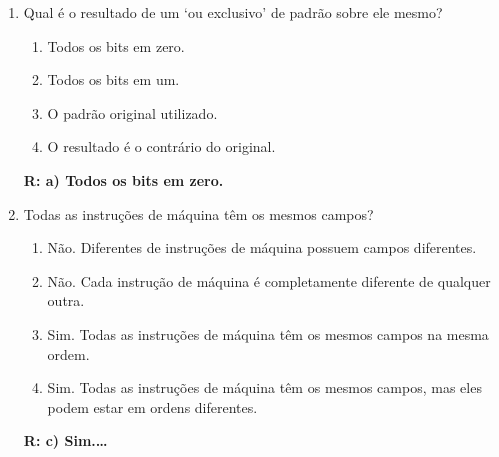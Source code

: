 \documentclass[a4paper,11pt]{article}
\begin{document}
\begin{enumerate}
    \item{Qual é o resultado de um `ou exclusivo' de padrão sobre ele mesmo?}
        \begin{enumerate}
            \item{Todos os bits em zero.}
            \item{Todos os bits em um.}
            \item{O padrão original utilizado.}
            \item{O resultado é o contrário do original.}
        \end{enumerate}
        \textbf{R: a) Todos os bits em zero.}
        \newpage
    \item{Todas as instruções de máquina têm os mesmos campos?}
        \begin{enumerate}
            \item{Não. Diferentes de instruções de máquina possuem campos diferentes.}
            \item{Não. Cada instrução de máquina é completamente diferente de qualquer outra.}
            \item{Sim. Todas as instruções de máquina têm os mesmos campos na mesma ordem.}
            \item{Sim. Todas as instruções de máquina têm os mesmos campos, mas eles podem estar em ordens
                    diferentes.}
        \end{enumerate}
        \textbf{R: c) Sim.\dots}


\end{enumerate}
\end{document}

